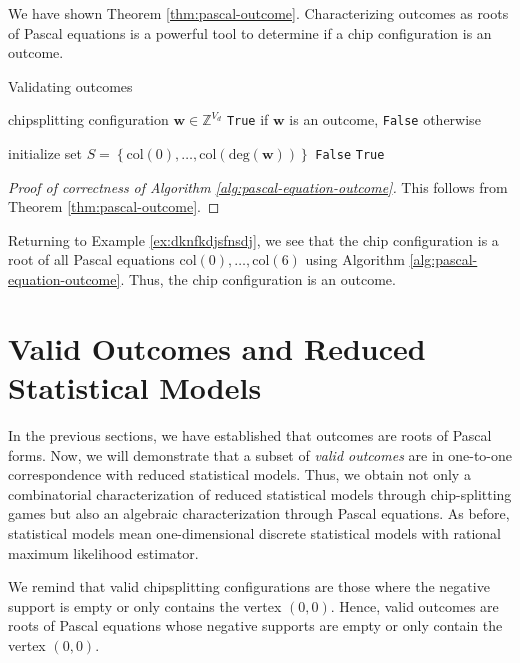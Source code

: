 We have shown Theorem \ref{thm:pascal-outcome}. Characterizing outcomes as roots of Pascal equations is a powerful tool to determine if a chip configuration is an outcome.

\begin{algorithm}
\caption{Validating outcomes}\label{alg:pascal-equation-outcome}
    \begin{algorithmic}[1]
    \Require chipsplitting configuration \( \mathbf w \in \mathbb{Z}^{V_d} \)
    \Ensure \texttt{True} if \( \mathbf w \) is an outcome, \texttt{False} otherwise

    \State initialize set \( S = \left\{ \mathrm{col}(0), \dots, \mathrm{col}(\mathrm{deg}(\mathbf w)) \right\} \)
        \State \Return \texttt{False}
        \EndIf
    \EndFor
    \State \Return \texttt{True}
    \EndFunction
    \end{algorithmic}  
\end{algorithm}

\begin{proof}[Proof of correctness of Algorithm \ref{alg:pascal-equation-outcome}]
    This follows from Theorem \ref{thm:pascal-outcome}.
\end{proof}

\begin{example}
    Returning to Example \ref{ex:dknfkdjsfnsdj}, we see that the chip configuration is a root of all Pascal equations \( \mathrm{col}(0), \dots, \mathrm{col}(6) \) using Algorithm \ref{alg:pascal-equation-outcome}. Thus, the chip configuration is an outcome.
\end{example}

\section{Valid Outcomes and Reduced Statistical Models}

In the previous sections, we have established that outcomes are roots of Pascal forms. Now, we will demonstrate that a subset of \emph{valid outcomes} are in one-to-one correspondence with reduced statistical models. Thus, we obtain not only a combinatorial characterization of reduced statistical models through chip-splitting games but also an algebraic characterization through Pascal equations. As before, statistical models mean one-dimensional discrete statistical models with rational maximum likelihood estimator.

We remind that valid chipsplitting configurations are those where the negative support is empty or only contains the vertex \( (0,0) \). Hence, valid outcomes are roots of Pascal equations whose negative supports are empty or only contain the vertex \( (0,0) \). 

